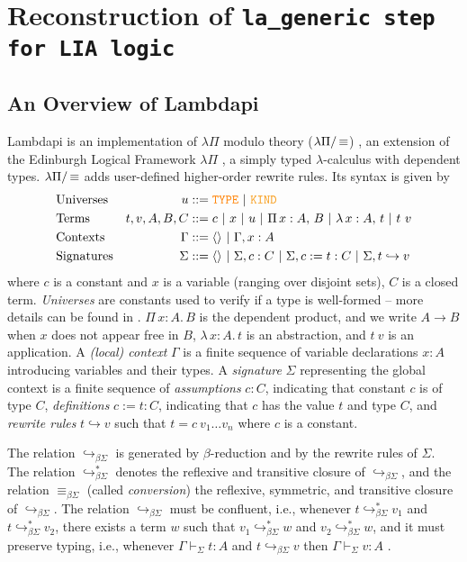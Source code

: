 \section{Reconstruction of \tt{la\_generic} step for LIA logic}
\label{sect:recon-lambdapi}

\subsection{An Overview of Lambdapi}
\label{ssect:lambdapi-overview}

Lambdapi is an implementation of $\lambda\Pi$ modulo theory ($\lambda\Pi/\mathop{\equiv}$) \cite{lambdapi}, an extension of the Edinburgh Logical Framework $\lambda\Pi$ \cite{lf}, a simply typed $\lambda$-calculus with dependent types. $\lambda\Pi/\mathop{\equiv}$ adds user-defined higher-order rewrite rules. Its syntax is given by
%
\begin{align*}
&\text{Universes}  &u &::= \type ~|~ \kind \\
&\text{Terms}   &t,v, A,B,C &::= c ~|~ x ~|~ u ~|~ \Pi\,x : A,\,B~|~ \lambda\,x : A,\,t ~|~t~v \\
&\text{Contexts}   &\Gamma &::= \langle \rangle ~|~ \Gamma, x : A \\
&\text{Signatures}  &\Sigma &::= \langle \rangle ~|~ \Sigma, c : C ~|~ \Sigma, c := t : C ~|~ \Sigma, t \hookrightarrow v 
\end{align*}
%
where $c$ is a constant and $x$ is a variable  (ranging over disjoint sets), $C$ is a closed term. \emph{Universes} are constants used to verify if a type is well-formed -- more details can be found in \cite[\S 2.1]{lf}. $\Pi\,x : A.\,B$ is the dependent product, and we write $A \rightarrow B$ when $x$ does not appear free in $B$, $\lambda\,x : A.\,t$ is an abstraction, and  $t~v$ is an application. A \emph{(local) context} $\Gamma$ is a finite sequence of variable declarations $x:A$ introducing variables and their types.
A \emph{signature} $\Sigma$ representing the global context is a finite sequence of \emph{assumptions} $c : C$, indicating that constant $c$ is of type $C$, \emph{definitions} $c := t : C$, indicating that $c$ has the value $t$ and type $C$, and \emph{rewrite rules} $t \hookrightarrow v$ such that $t = c~v_1 \dots v_n$ where $c$ is a constant.

The relation $\hookrightarrow_{\beta\Sigma}$ is generated by $\beta$-reduction and by the rewrite rules of $\Sigma$. The relation $\hookrightarrow_{\beta\Sigma}^*$ denotes the reflexive and transitive closure of $\hookrightarrow_{\beta\Sigma}$, and the relation $\equiv_{\beta\Sigma}$ (called \emph{conversion}) the reflexive, symmetric, and transitive closure of $\hookrightarrow_{\beta\Sigma}$. 
The relation $\hookrightarrow_{\beta\Sigma}$ must be confluent, i.e.,
whenever $t \hookrightarrow_{\beta\Sigma}^* v_1$ and $t \hookrightarrow_{\beta\Sigma}^* v_2$, there exists a term $w$ such that $v_1 \hookrightarrow_{\beta\Sigma}^* w$ and $v_2 \hookrightarrow_{\beta\Sigma}^* w$, and it must preserve typing, i.e., 
whenever $\Gamma \vdash_\Sigma t: A$ and $t \hookrightarrow_{\beta\Sigma} v$ then $\Gamma \vdash_\Sigma v: A$ \cite{blanqui:LIPIcs.FSCD.2020.13}.

